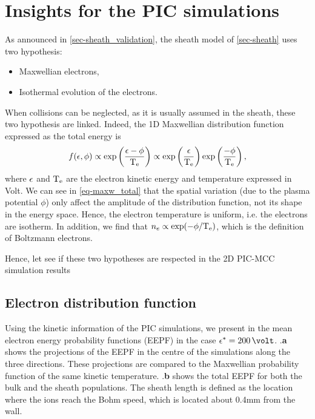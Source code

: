 


\section{Insights for the PIC simulations}
\label{sec-insights}

As announced in \vref{sec-sheath_validation}, the sheath model of \vref{sec-sheath} uses two hypothesis\string:
\begin{itemize}
  \item Maxwellian electrons,
  \item Isothermal evolution of the electrons.
\end{itemize}

When collisions can be neglected, as it is usually assumed in the sheath, these two hypothesis are linked.
Indeed, the \ac{1D} Maxwellian distribution function expressed as the total energy is
\begin{equation} \label{eq-maxw_total}
  f(\epsilon, \phi) \propto \exp \left( \frac{\epsilon - \phi}{\mathrm{T_e}}  \right)  \propto \exp \left( \frac{\epsilon}{\mathrm{T_e}} \right) \exp \left( \frac{-\phi}{\mathrm{T_e}} \right),
\end{equation}
where $\epsilon$ and $\mathrm{T_e}$ are the electron kinetic energy and temperature expressed in Volt.
We can see in \cref{eq-maxw_total} that the spatial variation (due to the plasma potential $\phi$) only affect the amplitude of the distribution function, not its shape in the energy space.
Hence, the electron temperature is uniform, i.e. the electrons are isotherm.
In addition, we find that $n_e \propto \exp (- \phi / \mathrm{T_e})$, which is the definition of Boltzmann electrons.

Hence, let see if these two hypotheses are respected  in the \ac{2D} \ac{PIC}-\ac{MCC} simulation results

\subsection{Electron distribution function}
\label{subsec-eedf_2D}

Using the kinetic information of the PIC simulations, we present in  the mean electron energy probability functions (EEPF) in the case $\crover = 200\,\volt$.
.{\bf a} shows the projections of the EEPF in the centre of the simulations along the three directions.
These projections are compared to the Maxwellian probability function of the same
kinetic temperature.
.{\bf b} shows the total EEPF for both the bulk and the sheath populations.
 The sheath length is defined as the location where the ions reach the Bohm speed, which is located about 0.4mm from the wall.
 
